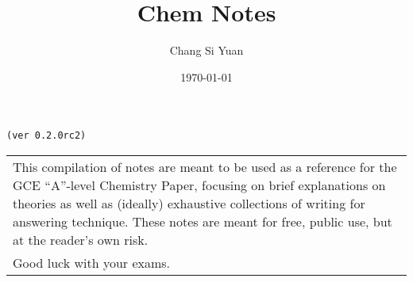 \documentclass[../main]{subfiles}
\begin{document}
\author{Chang Si Yuan}
\title{Chem Notes}
\date{\today}

\maketitle

\begin{center}

	\texttt{(ver 0.2.0rc2)}

	\vspace{50pt}

	\begin{tabular}{>{\flushleft}p{8cm}}
	This compilation of notes are meant to be used as a reference for the GCE ``A''-level Chemistry Paper, focusing on brief explanations on theories as well as (ideally) exhaustive collections of writing for answering technique. These notes are meant for free, public use, but at the reader's own risk. \\
	Good luck with your exams.
	\end{tabular}

\end{center}

\newpage
\end{document}
